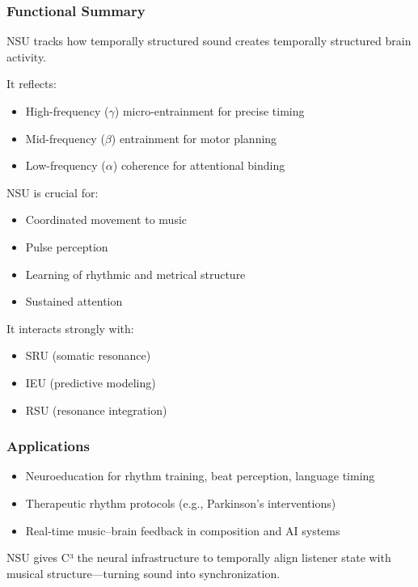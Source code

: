 \documentclass[10pt]{article}
\begin{document}
\subsubsection*{Functional Summary}

NSU tracks how temporally structured sound creates temporally structured brain activity.

It reflects:

\begin{itemize}
    \item High-frequency ($\gamma$) micro-entrainment for precise timing
    \item Mid-frequency ($\beta$) entrainment for motor planning
    \item Low-frequency ($\alpha$) coherence for attentional binding
\end{itemize}

NSU is crucial for:

\begin{itemize}
    \item Coordinated movement to music
    \item Pulse perception
    \item Learning of rhythmic and metrical structure
    \item Sustained attention
\end{itemize}

It interacts strongly with:

\begin{itemize}
    \item SRU (somatic resonance)
    \item IEU (predictive modeling)
    \item RSU (resonance integration)
\end{itemize}

\subsubsection*{Applications}

\begin{itemize}
    \item Neuroeducation for rhythm training, beat perception, language timing
    \item Therapeutic rhythm protocols (e.g., Parkinson’s interventions)
    \item Real-time music–brain feedback in composition and AI systems
\end{itemize}

NSU gives C³ the neural infrastructure to temporally align listener state with musical structure—turning sound into synchronization.
\end{document}
